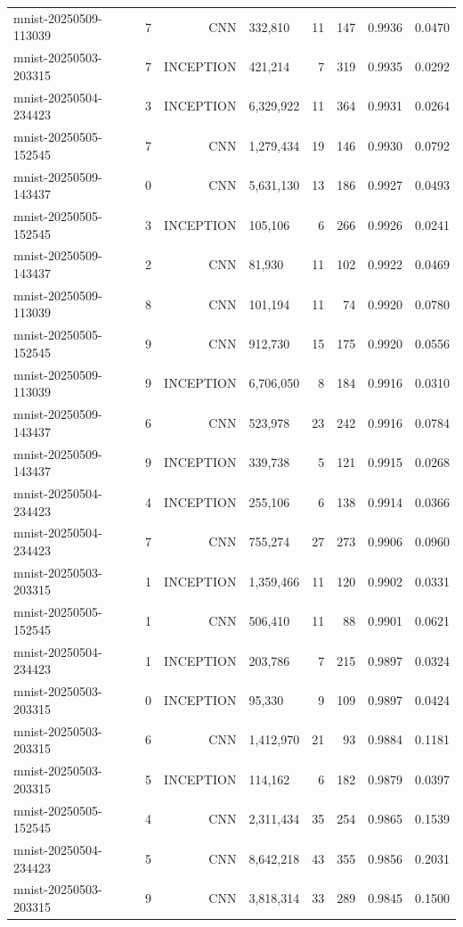 \begin{tabular}{llrlrrrr}
mnist-20250509-113039 & 7 & CNN & 332,810 & 11 & 147 & 0.9936 & 0.0470 \\
mnist-20250503-203315 & 7 & INCEPTION & 421,214 & 7 & 319 & 0.9935 & 0.0292 \\
mnist-20250504-234423 & 3 & INCEPTION & 6,329,922 & 11 & 364 & 0.9931 & 0.0264 \\
mnist-20250505-152545 & 7 & CNN & 1,279,434 & 19 & 146 & 0.9930 & 0.0792 \\
mnist-20250509-143437 & 0 & CNN & 5,631,130 & 13 & 186 & 0.9927 & 0.0493 \\
mnist-20250505-152545 & 3 & INCEPTION & 105,106 & 6 & 266 & 0.9926 & 0.0241 \\
mnist-20250509-143437 & 2 & CNN & 81,930 & 11 & 102 & 0.9922 & 0.0469 \\
mnist-20250509-113039 & 8 & CNN & 101,194 & 11 & 74 & 0.9920 & 0.0780 \\
mnist-20250505-152545 & 9 & CNN & 912,730 & 15 & 175 & 0.9920 & 0.0556 \\
mnist-20250509-113039 & 9 & INCEPTION & 6,706,050 & 8 & 184 & 0.9916 & 0.0310 \\
mnist-20250509-143437 & 6 & CNN & 523,978 & 23 & 242 & 0.9916 & 0.0784 \\
mnist-20250509-143437 & 9 & INCEPTION & 339,738 & 5 & 121 & 0.9915 & 0.0268 \\
mnist-20250504-234423 & 4 & INCEPTION & 255,106 & 6 & 138 & 0.9914 & 0.0366 \\
mnist-20250504-234423 & 7 & CNN & 755,274 & 27 & 273 & 0.9906 & 0.0960 \\
mnist-20250503-203315 & 1 & INCEPTION & 1,359,466 & 11 & 120 & 0.9902 & 0.0331 \\
mnist-20250505-152545 & 1 & CNN & 506,410 & 11 & 88 & 0.9901 & 0.0621 \\
mnist-20250504-234423 & 1 & INCEPTION & 203,786 & 7 & 215 & 0.9897 & 0.0324 \\
mnist-20250503-203315 & 0 & INCEPTION & 95,330 & 9 & 109 & 0.9897 & 0.0424 \\
mnist-20250503-203315 & 6 & CNN & 1,412,970 & 21 & 93 & 0.9884 & 0.1181 \\
mnist-20250503-203315 & 5 & INCEPTION & 114,162 & 6 & 182 & 0.9879 & 0.0397 \\
mnist-20250505-152545 & 4 & CNN & 2,311,434 & 35 & 254 & 0.9865 & 0.1539 \\
mnist-20250504-234423 & 5 & CNN & 8,642,218 & 43 & 355 & 0.9856 & 0.2031 \\
mnist-20250503-203315 & 9 & CNN & 3,818,314 & 33 & 289 & 0.9845 & 0.1500 \\

\end{tabular}
